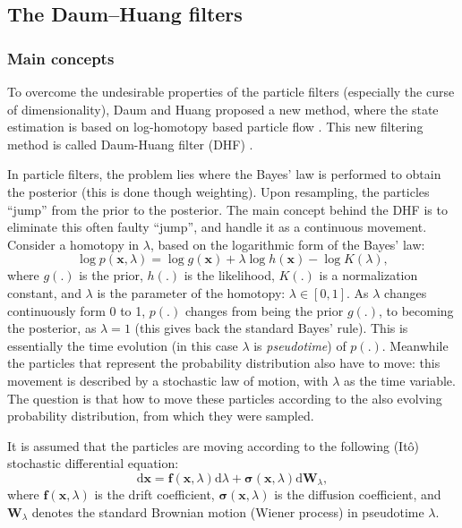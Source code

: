 \subsection{The Daum--Huang filters}
\subsubsection{Main concepts}
To overcome the  undesirable properties of the particle filters (especially the curse of dimensionality), Daum and Huang proposed a new method, where the state estimation is based on log-homotopy based particle flow \cite{Daum2007}. This new filtering method is called Daum-Huang filter (DHF) \cite{Choi2011}.

In particle filters, the problem lies where the Bayes' law is performed to obtain the posterior (this is done though weighting). Upon resampling, the particles ``jump'' from the prior to the posterior. The main concept behind the DHF is to eliminate this often faulty ``jump'', and handle it as a continuous movement. Consider a homotopy in $\lambda$, based on the logarithmic form of the Bayes' law:
\begin{equation}\label{eq:bayes-loghom}
    \log p(\mathbf{x},\lambda) = \log g(\mathbf{x}) + \lambda \log h(\mathbf{x}) - \log K(\lambda),
\end{equation}
where $g(.)$ is the prior, $h(.)$ is the likelihood, $K(.)$ is a normalization constant, and $\lambda$ is the parameter of the homotopy: $\lambda \in [0,1]$. As $\lambda$ changes continuously form 0 to 1, $p(.)$ changes from being the prior $g(.)$, to becoming the posterior, as $\lambda = 1$ (this gives back the standard Bayes' rule). This is essentially the time evolution (in this case $\lambda$ is \emph{pseudotime}) of $p(.)$. Meanwhile the particles that represent the probability distribution also have to move: this movement is described by a stochastic law of motion, with $\lambda$ as the time variable. The question is that how to move these particles according to the also evolving probability distribution, from which they were sampled.

It is assumed that the particles are moving according to the following (It\^{o}) stochastic  differential equation:
\begin{equation}\label{eq:dhf-sde}
    \mathrm{d} \mathbf{x}=\mathbf{f}(\mathbf{x}, \lambda) \mathrm{d} \lambda+\boldsymbol{\sigma}(\mathbf{x}, \lambda) \mathrm{d} \mathbf{W}_{\lambda},
\end{equation}
where $\mathbf{f}(\mathbf{x},\lambda)$ is the drift coefficient,
$\boldsymbol\sigma(\mathbf{x},\lambda)$ is the diffusion coefficient,
and $\mathbf{W}_\lambda$ denotes the standard Brownian motion (Wiener process) in
pseudotime $\lambda$.

